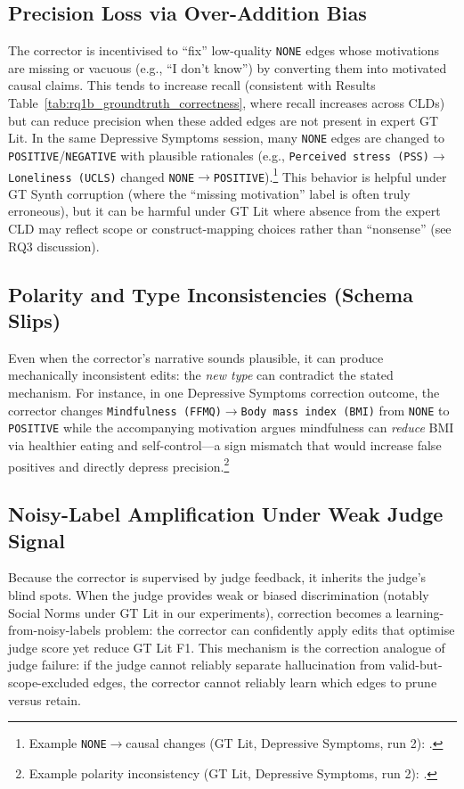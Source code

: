 \subsection{Precision Loss via Over-Addition Bias}
The corrector is incentivised to ``fix'' low-quality \texttt{NONE} edges whose motivations are missing or vacuous (e.g., ``I don't know'') by converting them into motivated causal claims. This tends to increase recall (consistent with Results Table~\ref{tab:rq1b_groundtruth_correctness}, where recall increases across CLDs) but can reduce precision when these added edges are not present in expert GT Lit. In the same Depressive Symptoms session, many \texttt{NONE} edges are changed to \texttt{POSITIVE}/\texttt{NEGATIVE} with plausible rationales (e.g., \texttt{Perceived stress (PSS)}$\rightarrow$\texttt{Loneliness (UCLS)} changed \texttt{NONE}$\rightarrow$\texttt{POSITIVE}).\footnote{Example \texttt{NONE}$\rightarrow$causal changes (GT Lit, Depressive Symptoms, run 2): .}%
This behavior is helpful under GT Synth corruption (where the ``missing motivation'' label is often truly erroneous), but it can be harmful under GT Lit where absence from the expert CLD may reflect scope or construct-mapping choices rather than ``nonsense'' (see RQ3 discussion).

\subsection{Polarity and Type Inconsistencies (Schema Slips)}
Even when the corrector's narrative sounds plausible, it can produce mechanically inconsistent edits: the \emph{new type} can contradict the stated mechanism. For instance, in one Depressive Symptoms correction outcome, the corrector changes \texttt{Mindfulness (FFMQ)}$\rightarrow$\texttt{Body mass index (BMI)} from \texttt{NONE} to \texttt{POSITIVE} while the accompanying motivation argues mindfulness can \emph{reduce} BMI via healthier eating and self-control---a sign mismatch that would increase false positives and directly depress precision.\footnote{Example polarity inconsistency (GT Lit, Depressive Symptoms, run 2): .}%

\subsection{Noisy-Label Amplification Under Weak Judge Signal}
Because the corrector is supervised by judge feedback, it inherits the judge's blind spots. When the judge provides weak or biased discrimination (notably Social Norms under GT Lit in our experiments), correction becomes a learning-from-noisy-labels problem: the corrector can confidently apply edits that optimise judge score yet reduce GT Lit F1. This mechanism is the correction analogue of judge failure: if the judge cannot reliably separate hallucination from valid-but-scope-excluded edges, the corrector cannot reliably learn which edges to prune versus retain.

